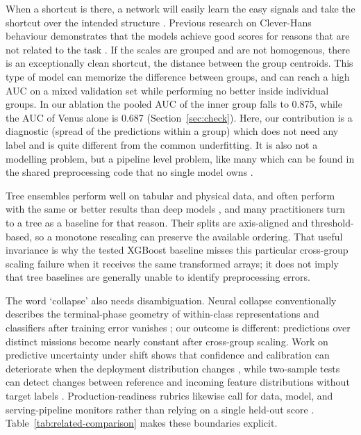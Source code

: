 \documentclass[preprint,12pt,authoryear,doubleblind]{elsarticle}
\begin{document}
When a shortcut is there, a network will easily learn the easy signals and take the shortcut over the intended structure \citep{geirhos2020,shah2020}. Previous research on Clever-Hans behaviour demonstrates that the models achieve good scores for reasons that are not related to the task \citep{lapuschkin2019}. If the scales are grouped and are not homogenous, there is an exceptionally clean shortcut, the distance between the group centroids. This type of model can memorize the difference between groups, and can reach a high AUC on a mixed validation set while performing no better inside individual groups. In our ablation the pooled AUC of the inner group falls to 0.875, while the AUC of Venus alone is 0.687 (Section~\ref{sec:check}). Here, our contribution is a diagnostic (spread of the predictions within a group) which does not need any label and is quite different from the common underfitting. It is also not a modelling problem, but a pipeline level problem, like many which can be found in the shared preprocessing code that no single model owns \citep{chaudhary2018}.

Tree ensembles perform well on tabular and physical data, and often perform with the same or better results than deep models \citep{chen2016,grinsztajn2022,shwartz2022,ke2017,pasaribu2024}, and many practitioners turn to a tree as a baseline for that reason. Their splits are axis-aligned and threshold-based, so a monotone rescaling can preserve the available ordering. That useful invariance is why the tested XGBoost baseline misses this particular cross-group scaling failure when it receives the same transformed arrays; it does not imply that tree baselines are generally unable to identify preprocessing errors.

The word `collapse' also needs disambiguation. Neural collapse conventionally describes the terminal-phase geometry of within-class representations and classifiers after training error vanishes \citep{papyan2020}; our outcome is different: predictions over distinct missions become nearly constant after cross-group scaling. Work on predictive uncertainty under shift shows that confidence and calibration can deteriorate when the deployment distribution changes \citep{ovadia2019}, while two-sample tests can detect changes between reference and incoming feature distributions without target labels \citep{rabanser2019}. Production-readiness rubrics likewise call for data, model, and serving-pipeline monitors rather than relying on a single held-out score \citep{breck2017}. Table~\ref{tab:related-comparison} makes these boundaries explicit.
\end{document}
